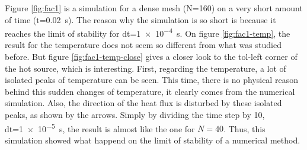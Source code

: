 \documentclass[a4paper,12pt,twoside]{article}
\begin{document}
Figure \ref{fig:fac1} is a simulation for a dense mesh (N=160) on a very short amount of time (t=\SI{0.02}{\s}).
The reason why the simulation is so short is because it reaches the limit of stability for dt=\SI{1e-4}{\s}.
On figure \ref{fig:fac1-temp}, the result for the temperature does not seem so different from what was studied before.
But figure \ref{fig:fac1-temp-close} gives a closer look to the tol-left corner of the hot source, which is interesting.
First, regarding the temperature, a lot of isolated peaks of temperature can be seen.
This time, there is no physical reason behind this sudden changes of temperature, it clearly comes from the numerical simulation.
Also, the direction of the heat flux is disturbed by these isolated peaks, as shown by the arrows.
Simply by dividing the time step by \num{10}, dt=\SI{1e-5}{\s}, the result is almost like the one for $N=40$.
Thus, this simulation showed what happend on the limit of stability of a numerical method.
\end{document}
